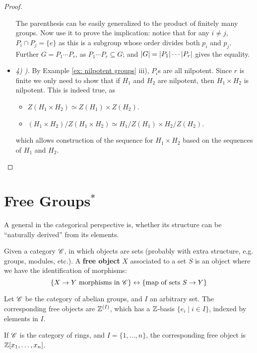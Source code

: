 \documentclass{article}
\begin{document}
\begin{proof}
\begin{itemize}
        The parenthesis can be easily generalized to the product of finitely many groups. Now use it to prove the implication: notice that for any $i \neq j$, $P_i \cap P_j = \{e\}$ as this is a subgroup whose order divides both $p_i$ and $p_j$. Further $G = P_1 \cdots P_r$, as $P_1 \cdots P_r \subseteq G$; and $\left|G\right| = \left|P_1\right| \cdots \left|P_r\right|$ gives the equality.
        \item \emph{4) ).} By Example \ref{ex: nilpotent groups} iii), $P_i$s are all nilpotent. Since $r$ is finite we only need to show that if $H_1$ and $H_2$ are nilpotent, then $H_1 \times H_2$ is nilpotent. This is indeed true, as
        \begin{itemize}
            \item $Z(H_1 \times H_2) \simeq Z(H_1) \times Z(H_2)$.
            \item $(H_1 \times H_2)/Z(H_1 \times H_2) \simeq H_1/Z(H_1) \times H_2/Z(H_2)$.
        \end{itemize}
        which allows construction of the sequence for $H_1 \times H_2$ based on the sequences of $H_1$ and $H_2$.
    \end{itemize}
\end{proof}

\section{Free Groups$^{\ast}$}

\textstart
A general in the categorical perspective is, whether its structure can be ``naturally derived'' from its elements.

\begin{definition}
    Given a category $\mathscr{C}$, in which objects are sets (probably with extra structure, e.g. groups, modules, etc.). A \textbf{free object} $X$ associated to a set $S$ is an object where we have the identification of morphisms:
    \[
        \{X \to Y \text{ morphisms in $\mathscr{C}$}\} \leftrightarrow \{ \text{map of sets $S \to Y$} \}
    \] 
\end{definition}

\begin{example}
    Let $\mathscr{C}$ be the category of abelian groups, and $I$ an arbitrary set. The corresponding free objects are $\mathbb{Z}^{(I)}$, which has a $\mathbb{Z}$-basis $\{e_i \mid i \in I\}$, indexed by elements in $I$. 

    If $\mathscr{C}$ is the category of rings, and $I = \{1, \dots, n\}$, the corresponding free object is $\mathbb{Z}[x_1, \dots, x_n]$.
\end{example}
\end{document}
